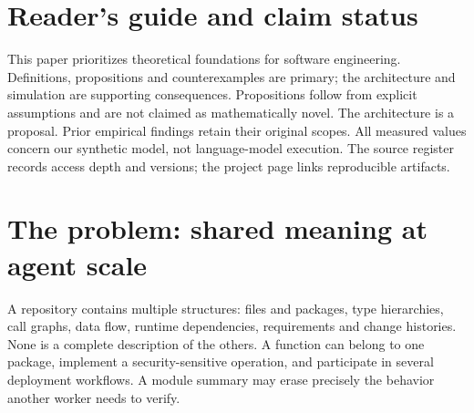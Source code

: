 \documentclass[11pt]{article}
\begin{document}
\begin{abstract}
Hundreds of specialized software-engineering agents need a common way to refer to code, requirements, contracts, behavior and evidence. Messages and embedding neighborhoods do not by themselves supply that common semantics. This paper examines hierarchical abstraction as a foundation for ontology graphs, distinguishing semantic abstraction, ontological classification, retrieval organization and execution coordination. Drawing on abstract interpretation, concept lattices, behavioral subtyping, ontology modularity and distributed-state theory, we define contextual abstraction domains and task-relative sufficiency. Elementary propositions establish composition conditions, distinctions that a sufficient abstraction must retain, and a restricted condition for safe parallel vocabulary extension. Counterexamples show why lossy summaries cannot justify universal software claims and why convergent record merging can create an inconsistent ontology. We propose a typed, polyhierarchical graph with revision-scoped claims, abstraction certificates and a controlled admission projection. A reproducible simulation at 100, 300 and 1,000 logical workers illustrates structural routing consequences: a complete multi-view hierarchy matches a complete flat index, missing cross-module membership reduces recall, and coverage-aware fallback increases candidate cost. The framework treats hierarchy as a semantic interface with obligations, not a guarantee that more agents produce better software.
\end{abstract}
\section*{Reader's guide and claim status}
This paper prioritizes theoretical foundations for software engineering. Definitions, propositions and counterexamples are primary; the architecture and simulation are supporting consequences. Propositions follow from explicit assumptions and are not claimed as mathematically novel. The architecture is a proposal. Prior empirical findings retain their original scopes. All measured values concern our synthetic model, not language-model execution. The source register records access depth and versions; the project page links reproducible artifacts.
\tableofcontents\clearpage

\section{The problem: shared meaning at agent scale}
A repository contains multiple structures: files and packages, type hierarchies, call graphs, data flow, runtime dependencies, requirements and change histories. None is a complete description of the others. A function can belong to one package, implement a security-sensitive operation, and participate in several deployment workflows. A module summary may erase precisely the behavior another worker needs to verify.
\end{document}
